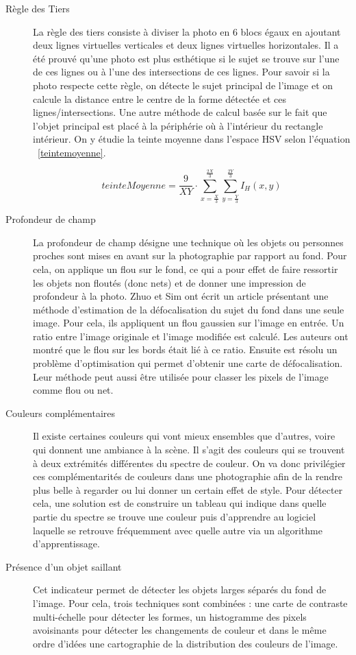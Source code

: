 \documentclass[11pt, french]{report-rd-info}
\begin{document}
\begin{description}
\item[Règle des Tiers]
La règle des tiers consiste à diviser la photo en 6 blocs égaux en ajoutant deux lignes virtuelles verticales et deux lignes virtuelles horizontales. Il a  été prouvé qu’une photo est plus esthétique si le sujet se trouve sur l’une de ces lignes ou à l’une des intersections de ces lignes. Pour savoir si la photo respecte cette règle, on détecte le sujet principal de l’image et on calcule la distance entre le centre de la forme détectée et ces lignes/intersections. Une autre méthode de calcul basée sur le fait que l'objet principal est placé à la périphérie où à l'intérieur du rectangle intérieur. On y étudie la teinte moyenne dans l'espace HSV selon l'équation ~\ref{teintemoyenne}. 

\begin{equation}
teinteMoyenne = \frac{9}{XY}\cdot \sum_{x=\frac{X}{3}}^{\frac{2X}{3}} \sum_{y=\frac{Y}{3}}^{\frac{2Y}{3}} I_H(x,y)
\label{teintemoyenne}
\end{equation}

\item[Profondeur de champ]
La profondeur de champ désigne une technique où les objets ou personnes proches sont mises en avant sur la photographie par rapport au fond. Pour cela, on applique un flou sur  le fond, ce qui a pour effet de faire ressortir les objets non floutés (donc nets) et de donner une impression de profondeur à la photo. Zhuo et Sim ont écrit un article\cite{Zhuo2011} présentant une méthode d’estimation de la défocalisation du sujet du fond dans une seule image. Pour cela, ils appliquent un flou gaussien sur l’image en  entrée. Un ratio entre l’image originale et l’image modifiée est calculé. Les auteurs ont montré que le flou sur les bords était lié à ce ratio. Ensuite est résolu un problème d’optimisation qui permet d’obtenir une carte de défocalisation. Leur méthode peut aussi être utilisée pour classer les pixels de l’image comme flou ou net.
\item[Couleurs complémentaires]
Il existe certaines couleurs qui vont mieux ensembles que d’autres, voire qui donnent une ambiance à la scène. Il s’agit des couleurs qui se trouvent à deux extrémités différentes du spectre de couleur. On va donc privilégier ces complémentarités de couleurs dans une photographie afin de la rendre plus belle à regarder ou lui donner un certain effet de style. Pour détecter cela, une solution est de construire un tableau  qui indique dans quelle partie du spectre se trouve une couleur puis d’apprendre au logiciel laquelle se retrouve fréquemment  avec quelle autre via un algorithme d’apprentissage.
\item[Présence d'un objet saillant]
Cet indicateur permet de détecter les objets larges séparés du fond de l’image. Pour cela, trois techniques sont combinées : une carte de contraste multi-échelle pour détecter les formes, un histogramme des pixels avoisinants pour détecter les changements de couleur et dans le même ordre d’idées une cartographie de la distribution des couleurs de l’image.
\end{description}
\end{document}
